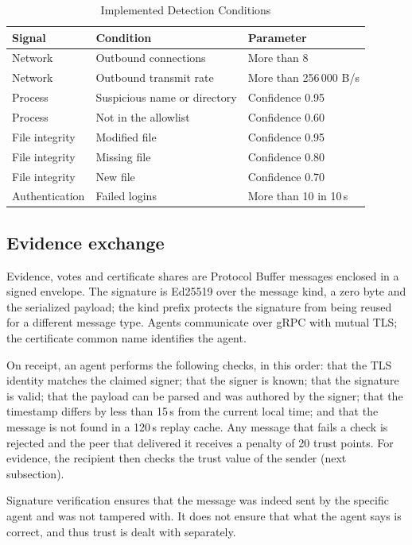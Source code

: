 \documentclass[journal]{IEEEtran}
\begin{document}
\begin{table}[!t]
\caption{Implemented Detection Conditions}
\label{tab:signals}
\centering\small
\begin{tabularx}{\columnwidth}{@{}l Y Y@{}}
\toprule
Signal & Condition & Parameter \\
\midrule
Network & Outbound connections & More than 8 \\
Network & Outbound transmit rate & More than 256\,000 B/s \\
Process & Suspicious name or directory & Confidence 0.95 \\
Process & Not in the allowlist & Confidence 0.60 \\
File integrity & Modified file & Confidence 0.95 \\
File integrity & Missing file & Confidence 0.80 \\
File integrity & New file & Confidence 0.70 \\
Authentication & Failed logins & More than 10 in 10\,s \\
\bottomrule
\end{tabularx}
\end{table}

\subsection{Evidence exchange}
Evidence, votes and certificate shares are Protocol Buffer messages enclosed in a signed envelope. The signature is Ed25519 over the message kind, a zero byte and the serialized payload; the kind prefix protects the signature from being reused for a different message type. Agents communicate over gRPC with mutual TLS; the certificate common name identifies the agent.

On receipt, an agent performs the following checks, in this order: that the TLS identity matches the claimed signer; that the signer is known; that the signature is valid; that the payload can be parsed and was authored by the signer; that the timestamp differs by less than 15\,s from the current local time; and that the message is not found in a 120\,s replay cache. Any message that fails a check is rejected and the peer that delivered it receives a penalty of 20 trust points. For evidence, the recipient then checks the trust value of the sender (next subsection).

Signature verification ensures that the message was indeed sent by the specific agent and was not tampered with. It does not ensure that what the agent says is correct, and thus trust is dealt with separately.
\end{document}
